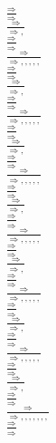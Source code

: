 \documentclass[11pt]{article}
\begin{document}
\begin{center}
\bigskip
\\$\frac{\Rightarrow }{\Rightarrow }$
\bigskip
\\$\frac{\Rightarrow }{\Rightarrow , }$
\bigskip
\\$\frac{\Rightarrow }{\Rightarrow }$
\bigskip
\\$\frac{\Rightarrow }{\Rightarrow , , , , , }$
\bigskip
\\$\frac{\Rightarrow }{\Rightarrow }$
\bigskip
\\$\frac{\Rightarrow }{\Rightarrow , }$
\bigskip
\\$\frac{\Rightarrow }{\Rightarrow }$
\bigskip
\\$\frac{\Rightarrow }{\Rightarrow , , , , , }$
\bigskip
\\$\frac{\Rightarrow }{\Rightarrow }$
\bigskip
\\$\frac{\Rightarrow }{\Rightarrow , }$
\bigskip
\\$\frac{\Rightarrow }{\Rightarrow }$
\bigskip
\\$\frac{\Rightarrow }{\Rightarrow , , , , , }$
\bigskip
\\$\frac{\Rightarrow }{\Rightarrow }$
\bigskip
\\$\frac{\Rightarrow }{\Rightarrow , }$
\bigskip
\\$\frac{\Rightarrow }{\Rightarrow }$
\bigskip
\\$\frac{\Rightarrow }{\Rightarrow , , , , , }$
\bigskip
\\$\frac{\Rightarrow }{\Rightarrow }$
\bigskip
\\$\frac{\Rightarrow }{\Rightarrow , }$
\bigskip
\\$\frac{\Rightarrow }{\Rightarrow }$
\bigskip
\\$\frac{\Rightarrow }{\Rightarrow , , , , , }$
\bigskip
\\$\frac{\Rightarrow }{\Rightarrow }$
\bigskip
\\$\frac{\Rightarrow }{\Rightarrow , }$
\bigskip
\\$\frac{\Rightarrow }{\Rightarrow }$
\bigskip
\\$\frac{\Rightarrow }{\Rightarrow , , , , , }$
\bigskip
\\$\frac{\Rightarrow }{\Rightarrow }$
\bigskip
\\$\frac{\Rightarrow }{\Rightarrow , }$
\bigskip
\\$\frac{\Rightarrow }{\Rightarrow }$
\bigskip
\\$\frac{\Rightarrow }{\Rightarrow , , , , , , , }$
\bigskip
\\$\frac{\Rightarrow }{\Rightarrow }$

\end{center}
\end{document}
